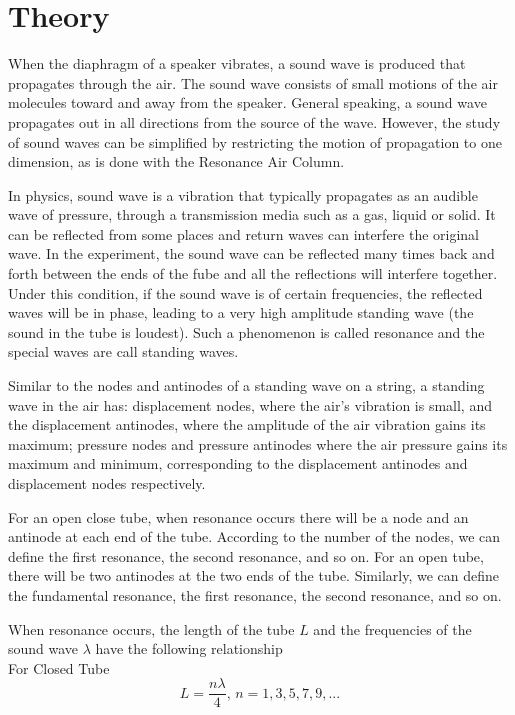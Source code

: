 \documentclass[12pt]{article}
\begin{document}
	\section{Theory}
	When the diaphragm of a speaker vibrates, a sound wave is produced that propagates through the air. The sound wave consists of small motions of the air molecules toward and away from the speaker. General speaking, a sound wave propagates out in all directions from the source of the wave. However, the study of sound waves can be simplified by restricting the motion of propagation to one dimension, as is done with the Resonance Air Column. \par
    In physics, sound wave is a vibration that typically propagates as an audible wave of pressure, through a transmission media such as a gas, liquid or solid. It can be reflected from some places and return waves can interfere the original wave. In the experiment, the sound wave can be reflected many times back and forth between the ends of the fube and all the reflections will interfere together. Under this condition, if the sound wave is of certain frequencies, the reflected waves will be in phase, leading to a very high amplitude standing wave (the sound in the tube is loudest). Such a phenomenon is called resonance and the special waves are call standing waves. \par
    Similar to the nodes and antinodes of a standing wave on a string, a standing wave in the air has: displacement nodes, where the air's vibration is small, and the displacement antinodes, where the amplitude of the air vibration gains its maximum; pressure nodes and pressure antinodes where the air pressure gains its maximum and minimum, corresponding to the displacement antinodes and displacement nodes respectively. \par
    For an open close tube, when resonance occurs there will be a node and an antinode at each end of the tube. According to the number of the nodes, we can define the first resonance, the second resonance, and so on. For an open tube, there will be two antinodes at the two ends of the tube. Similarly, we can define the fundamental resonance, the first resonance, the second resonance, and so on. \par
    When resonance occurs, the length of the tube $L$ and the frequencies of the sound wave $\lambda$ have the following relationship\\
    For Closed Tube
    \begin{equation}
        L = \frac{n\lambda}{4},\, n = 1, 3, 5, 7, 9, ...
    \end{equation}
\end{document}
